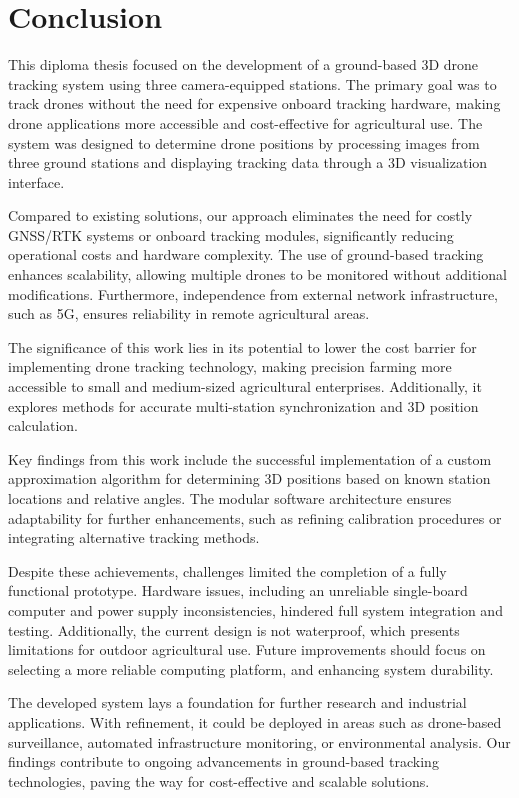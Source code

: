 \chapter{Conclusion}

This diploma thesis focused on the development of a ground-based 3D drone tracking system using three camera-equipped stations. The primary goal was to track drones without the need for expensive onboard tracking hardware, making drone applications more accessible and cost-effective for agricultural use. The system was designed to determine drone positions by processing images from three ground stations and displaying tracking data through a 3D visualization interface.

Compared to existing solutions, our approach eliminates the need for costly GNSS/RTK systems or onboard tracking modules, significantly reducing operational costs and hardware complexity. The use of ground-based tracking enhances scalability, allowing multiple drones to be monitored without additional modifications. Furthermore, independence from external network infrastructure, such as 5G, ensures reliability in remote agricultural areas.

The significance of this work lies in its potential to lower the cost barrier for implementing drone tracking technology, making precision farming more accessible to small and medium-sized agricultural enterprises. Additionally, it explores methods for accurate multi-station synchronization and 3D position calculation.

Key findings from this work include the successful implementation of a custom approximation algorithm for determining 3D positions based on known station locations and relative angles. The modular software architecture ensures adaptability for further enhancements, such as refining calibration procedures or integrating alternative tracking methods.

Despite these achievements, challenges limited the completion of a fully functional prototype. Hardware issues, including an unreliable single-board computer and power supply inconsistencies, hindered full system integration and testing. Additionally, the current design is not waterproof, which presents limitations for outdoor agricultural use. Future improvements should focus on selecting a more reliable computing platform, and enhancing system durability.

The developed system lays a foundation for further research and industrial applications. With refinement, it could be deployed in areas such as drone-based surveillance, automated infrastructure monitoring, or environmental analysis. Our findings contribute to ongoing advancements in ground-based tracking technologies, paving the way for cost-effective and scalable solutions.
